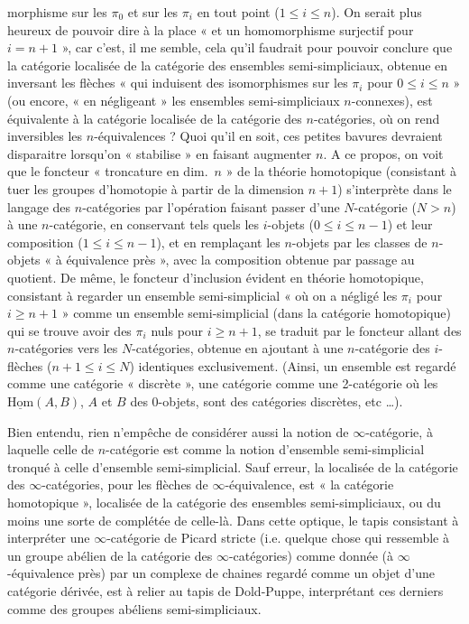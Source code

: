 \documentclass[11pt,a4paper]{article}
\begin{document}
morphisme sur les $\pi_0$ et sur les $\pi_i$ en tout point ($1 \leqslant i \leqslant n$). On serait plus heureux de pouvoir dire à la place « et  un homomorphisme surjectif pour $i = n+1$ », car c'est, il me semble, cela qu'il faudrait pour  pouvoir conclure que la catégorie localisée de la catégorie des ensembles semi-simpliciaux, obtenue en inversant les flèches « qui induisent des isomorphismes sur les $\pi_i$ pour $0 \leqslant i \leqslant n$ » (ou encore, « en négligeant » les ensembles semi-simpliciaux $n$-connexes), est équivalente à la catégorie localisée de la catégorie des $n$-catégories, où on rend inversibles les $n$-équivalences ? Quoi qu'il en soit, ces petites bavures devraient disparaitre lorsqu'on « stabilise » en faisant augmenter $n$. A ce propos, on voit que le foncteur « troncature en dim.~$n$ » de la théorie homotopique (consistant à tuer les groupes d'homotopie à partir de la dimension $n+1$) s'interprète dans le langage des $n$-catégories par l'opération faisant passer d'une $N$-catégorie ($N > n$) à une $n$-catégorie, en conservant tels quels les $i$-objets ($0 \leqslant i \leqslant n-1$) et leur composition ($1 \leqslant i \leqslant n-1$), et en remplaçant les $n$-objets par les classes de $n$-objets « à équivalence près », avec la composition obtenue par passage au quotient. De même, le foncteur d'inclusion évident en théorie homotopique, consistant à regarder un ensemble semi-simplicial « où on a négligé les $\pi_i$ pour $i \geqslant n+1$ » comme un ensemble semi-simplicial (dans la catégorie homotopique) qui se trouve avoir des $\pi_i$ nuls pour $i \geqslant n+1$, se traduit par le foncteur allant des $n$-catégories vers les $N$-catégories, obtenue en ajoutant à une $n$-catégorie des $i$-flèches ($n+1 \leqslant i \leqslant N$) identiques exclusivement. (Ainsi, un ensemble est regardé comme une catégorie « discrète », une catégorie comme une 2-catégorie où les $\underline{\mathrm{Hom}}(A, B)$, $A$ et $B$ des 0-objets, sont des catégories discrètes, etc …).

Bien entendu, rien n'empêche de considérer aussi la notion de $\infty$-catégorie, à laquelle celle de $n$-catégorie est comme la notion d'ensemble semi-simplicial tronqué à celle d'ensemble semi-simplicial. Sauf erreur, la localisée de la catégorie des $\infty$-catégories, pour les flèches de $\infty$-équivalence, est  « la catégorie homotopique », localisée de la catégorie des ensembles semi-simpliciaux, ou du moins une sorte de complétée de celle-là. Dans cette optique, le tapis consistant à interpréter une $\infty$-catégorie de Picard stricte (i.e. quelque chose qui ressemble à un groupe abélien de la catégorie des $\infty$-catégories) comme donnée (à $\infty$-équivalence près) par un complexe de chaines regardé comme un objet d'une catégorie dérivée, est à relier au tapis de Dold-Puppe, interprétant ces derniers comme des groupes abéliens semi-simpliciaux.
\end{document}
